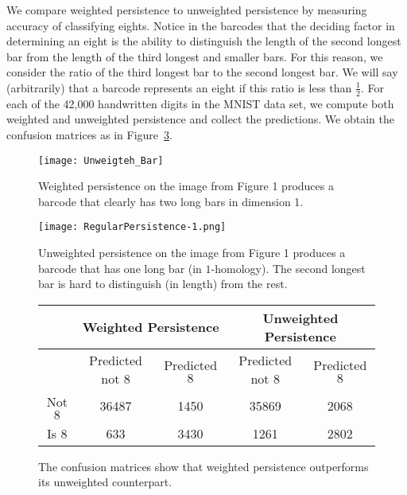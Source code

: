 \documentclass{amsart}
\newtheorem*{fibering lemma}{Fibering Lemma}
\newtheorem*{decomposition lemma}{Decomposition Lemma}
\newtheorem*{hurewicz theorem}{Hurewicz Theorem}
\theoremstyle{definition}
\begin{document}
We compare weighted persistence to unweighted persistence by measuring accuracy of classifying eights. Notice in the barcodes that the deciding factor in determining an eight is the ability to distinguish the length of the second longest bar from the length of the third longest and smaller bars. For this reason, we consider the ratio of the third longest bar to the second longest bar. We will say (arbitrarily) that a barcode represents an eight if this ratio is less than $\frac{1}{2}$. For each of the 42,000 handwritten digits in the MNIST data set, we compute both weighted and unweighted persistence and collect the predictions. We obtain the confusion matrices as in Figure~\ref{conf-mat}.



\begin{figure}
\begin{center}
\texttt{[image: Unweigteh\_Bar]}
\caption{Weighted persistence on the image from Figure 1 produces a barcode that clearly has two long bars in dimension 1.}\label{WeightedBar}
\end{center}
\end{figure}



\begin{figure}
\begin{center}
\texttt{[image: RegularPersistence-1.png]}%
\caption{Unweighted persistence on the image from Figure 1 produces a barcode that has one long bar (in $1$-homology). The second longest bar is hard to distinguish (in length) from the rest.}\label{UnweightedBar}
\end{center}
\end{figure}

\begin{figure}
\begin{center}%
    \begin{tabular}{|c|c|c||c|c|}\hline
    & \multicolumn{2}{c||}{Weighted Persistence} & \multicolumn{2}{c|}{Unweighted Persistence}\\ \hline
    & Predicted not $8$ & Predicted $8$ & Predicted not $8$ & Predicted $8$\\ \hline
    Not $8$ & 36487 & 1450 & 35869 & 2068 \\ \hline
    Is $8$ & 633 & 3430 & 1261 & 2802\\ \hline
\end{tabular}\caption{The confusion matrices show that weighted persistence outperforms its unweighted counterpart.}\label{conf-mat}
\end{center}

\end{figure}
\end{document}
